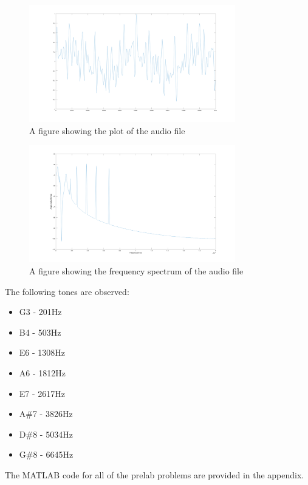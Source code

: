 \begin{figure}[H]
    \centering
    \includegraphics[width=0.8\textwidth]{images/prelab_problem_4_time.png}
    \caption{A figure showing the plot of the audio file}
\end{figure}
\begin{figure}[H]
    \centering
    \includegraphics[width=0.8\textwidth]{images/prelab_problem_4_freq.png}
    \caption{A figure showing the frequency spectrum of the audio file}
\end{figure}

The following tones are observed:
\begin{itemize}
    \item G3 - 201Hz
    \item B4 - 503Hz
    \item E6 - 1308Hz
    \item A6 - 1812Hz
    \item E7 - 2617Hz
    \item A\#7 - 3826Hz
    \item D\#8 - 5034Hz
    \item G\#8 - 6645Hz
\end{itemize}

The MATLAB code for all of the prelab problems are provided in the appendix.